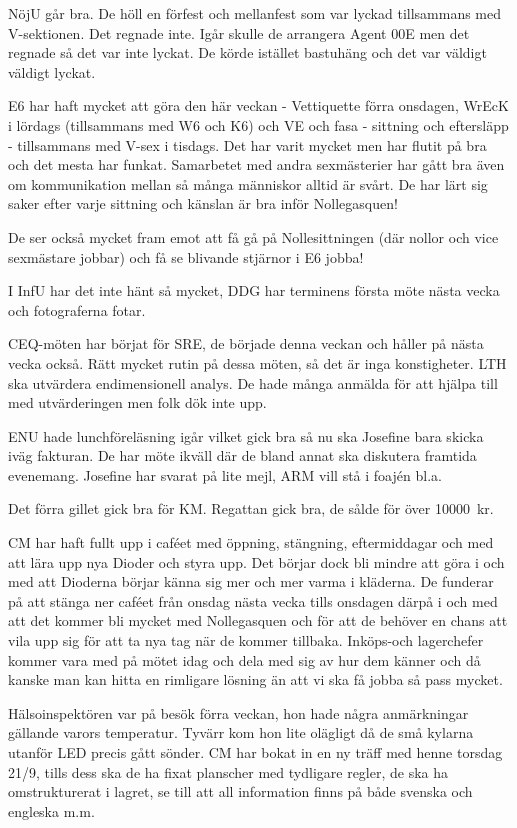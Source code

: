 \documentclass[10pt]{article}
\begin{document}
\begin{paragrafer}
\begin{paragrafer}
NöjU går bra. De höll en förfest och mellanfest som var lyckad tillsammans med V-sektionen. Det regnade inte. Igår skulle de arrangera Agent 00E men det regnade så det var inte lyckat. De körde istället bastuhäng och det var väldigt väldigt lyckat.

E6 har haft mycket att göra den här veckan - Vettiquette förra onsdagen, WrEcK i lördags (tillsammans med W6 och K6) och VE och fasa - sittning och eftersläpp - tillsammans med V-sex i tisdags. Det har varit mycket men har flutit på bra och det mesta har funkat. Samarbetet med andra sexmästerier har gått bra även om kommunikation mellan så många människor alltid är svårt. De har lärt sig saker efter varje sittning och känslan är bra inför Nollegasquen!

De ser också mycket fram emot att få gå på Nollesittningen (där nollor och vice sexmästare jobbar) och få se blivande stjärnor i E6 jobba!

I InfU har det inte hänt så mycket, DDG har terminens första möte nästa vecka och fotograferna fotar.

CEQ-möten har börjat för SRE, de började denna veckan och håller på nästa vecka också. Rätt mycket rutin på dessa möten, så det är inga konstigheter. LTH ska utvärdera endimensionell analys. De hade många anmälda för att hjälpa till med utvärderingen men folk dök inte upp.

ENU hade lunchföreläsning igår vilket gick bra så nu ska Josefine bara skicka iväg fakturan. De har möte ikväll där de bland annat ska diskutera framtida evenemang. Josefine har svarat på lite mejl, ARM vill stå i foajén bl.a.

Det förra gillet gick bra för KM. Regattan gick bra, de sålde för över \SI{10000}{kr}.

CM har haft fullt upp i caféet med öppning, stängning, eftermiddagar och med att lära upp nya Dioder och styra upp. Det börjar dock bli mindre att göra i och med att Dioderna börjar känna sig mer och mer varma i kläderna. De funderar på att stänga ner caféet från onsdag nästa vecka tills onsdagen därpå i och med att det kommer bli mycket med Nollegasquen och för att de behöver en chans att vila upp sig för att ta nya tag när de kommer tillbaka. Inköps-och lagerchefer kommer vara med på mötet idag och dela med sig av hur dem känner och då kanske man kan hitta en rimligare lösning än att vi ska få jobba så pass mycket.

Hälsoinspektören var på besök förra veckan, hon hade några anmärkningar gällande varors temperatur. Tyvärr kom hon lite olägligt då de små kylarna utanför LED precis gått sönder. CM har bokat in en ny träff med henne torsdag 21/9, tills dess ska de ha fixat planscher med tydligare regler, de ska ha omstrukturerat i lagret, se till att all information finns på både svenska och engleska m.m.


\end{paragrafer}
\end{paragrafer}
\end{document}
